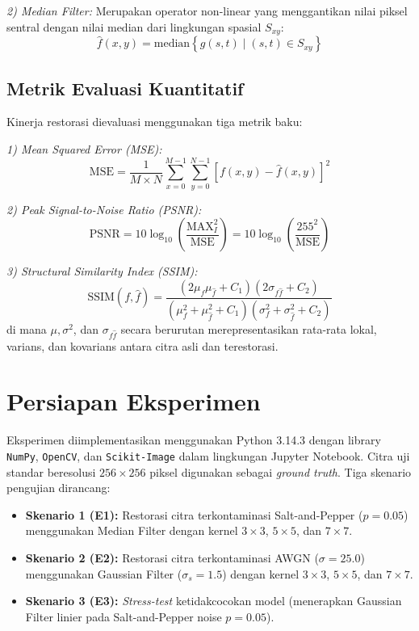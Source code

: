 \documentclass[conference,a4paper]{IEEEtran}
\begin{document}
\textit{2) Median Filter:} Merupakan operator non-linear yang menggantikan nilai piksel sentral dengan nilai median dari lingkungan spasial $S_{xy}$:
\begin{equation}
	\hat{f}(x, y) = \text{median}\left\{ g(s, t) \mid (s, t) \in S_{xy} \right\}
\end{equation}

\subsection{Metrik Evaluasi Kuantitatif}
Kinerja restorasi dievaluasi menggunakan tiga metrik baku:

\textit{1) Mean Squared Error (MSE):}
\begin{equation}
	\text{MSE} = \frac{1}{M \times N} \sum_{x=0}^{M-1} \sum_{y=0}^{N-1} \left[ f(x, y) - \hat{f}(x, y) \right]^2
\end{equation}

\textit{2) Peak Signal-to-Noise Ratio (PSNR):}
\begin{equation}
	\text{PSNR} = 10 \log_{10}\left( \frac{\text{MAX}_I^2}{\text{MSE}} \right) = 10 \log_{10}\left( \frac{255^2}{\text{MSE}} \right)
\end{equation}

\textit{3) Structural Similarity Index (SSIM):}
\begin{equation}
	\text{SSIM}(f, \hat{f}) = \frac{(2\mu_f\mu_{\hat{f}} + C_1)(2\sigma_{f\hat{f}} + C_2)}{(\mu_f^2 + \mu_{\hat{f}}^2 + C_1)(\sigma_f^2 + \sigma_{\hat{f}}^2 + C_2)}
\end{equation}
di mana $\mu, \sigma^2$, dan $\sigma_{f\hat{f}}$ secara berurutan merepresentasikan rata-rata lokal, varians, dan kovarians antara citra asli dan terestorasi.

\section{Persiapan Eksperimen}
Eksperimen diimplementasikan menggunakan Python 3.14.3 dengan library \texttt{NumPy}, \texttt{OpenCV}, dan \texttt{Scikit-Image} dalam lingkungan Jupyter Notebook. Citra uji standar beresolusi $256 \times 256$ piksel digunakan sebagai \textit{ground truth}. Tiga skenario pengujian dirancang:
\begin{itemize}
	\item \textbf{Skenario 1 (E1):} Restorasi citra terkontaminasi Salt-and-Pepper ($p=0.05$) menggunakan Median Filter dengan kernel $3\times3$, $5\times5$, dan $7\times7$.
	\item \textbf{Skenario 2 (E2):} Restorasi citra terkontaminasi AWGN ($\sigma=25.0$) menggunakan Gaussian Filter ($\sigma_s=1.5$) dengan kernel $3\times3$, $5\times5$, dan $7\times7$.
	\item \textbf{Skenario 3 (E3):} \textit{Stress-test} ketidakcocokan model (menerapkan Gaussian Filter linier pada Salt-and-Pepper noise $p=0.05$).
\end{itemize}
\end{document}
